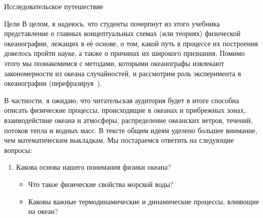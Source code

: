 \begin{chapter}{Исследовательское путешествие}
\begin{section}{Цели}
В целом, я надеюсь, что студенты почерпнут из этого учебника
представление о главных концептуальных схемах (или теориях) физической 
океанографии, лежащих в её основе, о том, какой путь в процессе их построения 
довелось пройти науке, а также о причинах их широкого признания. Помимо этого 
мы познакомимся с методами, которыми океанографы извлекают закономерности из
океана случайностей, и рассмотрим роль эксперимента в океанографии
(перефразируя~\cite[стр.~89]{Shamos:1995}).
%

В частности, я ожидаю, что читательская аудитория будет в итоге способна 
описать физические процессы, происходящие в океанах и прибрежных зонах, 
взаимодействие океана и атмосферы, распределение океанских ветров, течений, 
потоков тепла и водных масс. В тексте общим идеям уделено большее внимание, 
чем математическим выкладкам. Мы постараемся ответить на следующие вопросы:
%

\begin{enumerate}
\item
Какова основа нашего понимания физики океана?
%

\begin{itemize}
  \item
  Что такое физические свойства морской воды? 
%

  \item
  Каковы важные термодинамические и динамические процессы, влияющие на океан? 
%


\end{itemize}
\end{enumerate}
\end{section}
\end{chapter}
